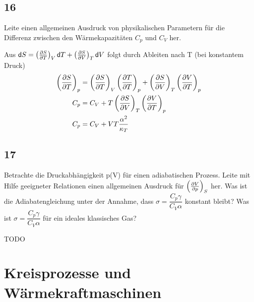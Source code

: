 \documentclass[12pt,a4paper]{report}
\newcommand{\dif}{\mathsf{d}}
\newcommand{\partddd}[3]{\ensuremath {\left(\frac{\partial #1}{\partial #2}}\right)_{#3}}
\newenvironment{myfrag}{\begin{it}}{\end{it}\vspace{3mm}\par}
\numberwithin{equation}{section}
\begin{document}
\subsection{16}
\begin{myfrag}
Leite einen allgemeinen Ausdruck von physikalischen Parametern für die
Differenz zwischen den Wärmekapazitäten $C_p$ und $C_V$ her.
\end{myfrag}
Aus $\dif S = \partddd STV\dif T+\partddd SVT\dif V$ folgt durch Ableiten nach T (bei konstantem Druck)
\begin{align}
	\partddd STp &=\partddd STV\partddd TTp+\partddd SVT\partddd VTp\\
	C_p&=C_V+T\partddd SVT\partddd VTp\\
	C_p&=C_V+VT\frac{\alpha^2}{\kappa_T}
\end{align}

\subsection{17}
\begin{myfrag}
Betrachte die Druckabhängigkeit p(V) für einen adiabatischen Prozess. Leite mit
Hilfe geeigneter Relationen einen allgemeinen Ausdruck für $\partddd VpS$ her. Was ist die Adiabatengleichung unter der Annahme, dass $\sigma = \dfrac{C_p\gamma}{C_V\alpha}$ konstant bleibt? Was ist $\sigma = \dfrac{C_p\gamma}{C_V\alpha}$ für ein ideales klassisches Gas?
\end{myfrag}
TODO

\section{Kreisprozesse und Wärmekraftmaschinen}
\end{document}
